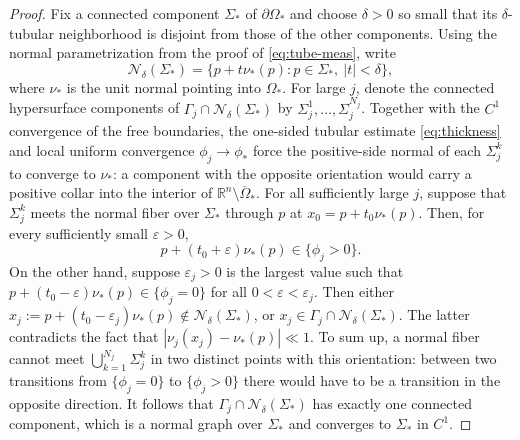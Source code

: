 \documentclass[11pt]{article}
\numberwithin{equation}{section}
\theoremstyle{definition}
\newcommand{\RR}{\mathbb{R}}
\begin{document}
\begin{proof}
Fix a connected component $\Sigma_*$ of $\partial\Omega_*$ and choose
$\delta>0$ so small that its $\delta$-tubular neighborhood is disjoint from those of
the other components. Using the normal parametrization from the proof of
\eqref{eq:tube-meas}, write
\[
    \mathcal N_\delta(\Sigma_*)
    =\{p+t\nu_*(p):p\in\Sigma_*,\ |t|<\delta\},
\]
where $\nu_*$ is the unit normal pointing into $\Omega_*$. For large $j$, denote the connected hypersurface
components of $\Gamma_j\cap\mathcal N_\delta(\Sigma_*)$ by
$\Sigma_j^1,\ldots,\Sigma_j^{N_j}$.
Together with the $C^1$ convergence of the free boundaries, the one-sided tubular estimate \eqref{eq:thickness} and local uniform convergence $\phi_j \to \phi_*$ force the positive-side normal of each $\Sigma_j^k$ to converge to $\nu_*$: a component with the opposite orientation would carry a positive collar into the interior of $\RR^n\setminus\overline\Omega_*$. For all sufficiently large $j$, suppose that $\Sigma_j^k$ meets the normal fiber over $\Sigma_*$ through $p$ at $x_0=p+t_0\nu_*(p)$. Then, for every
sufficiently small $\varepsilon>0$,   
\[  p+(t_0+\varepsilon)\nu_*(p)\in\{\phi_j>0\}. \]
On the other hand, suppose $\varepsilon_j>0$ is the largest value such that $p+(t_0-\varepsilon)\nu_*(p)\in\{\phi_j=0\}$ for all $0<\varepsilon< \varepsilon_j$. Then either $x_j:= p+(t_0-\varepsilon_j)\nu_*(p)\notin \mathcal{N}_\delta(\Sigma_*)$, or $x_j \in \Gamma_j \cap \mathcal{N}_\delta(\Sigma_*)$. The latter contradicts the fact that $|\nu_j(x_j)- \nu_*(p)| \ll 1$.
To sum up, a normal fiber cannot meet $\bigcup_{k=1}^{N_j}\Sigma_j^k$ in two distinct
points with this orientation: between two transitions from $\{\phi_j=0\}$ to
$\{\phi_j>0\}$ there would have to be a transition in the opposite direction.
It follows that $\Gamma_j\cap\mathcal N_\delta(\Sigma_*)$ has exactly one
connected component, which is a normal graph over $\Sigma_*$ and converges to
$\Sigma_*$ in $C^1$.


\end{proof}
\end{document}
